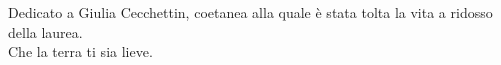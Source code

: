 \cleardoublepage
{}
\thispagestyle{empty}

\vspace*{3cm}

\begin{center}
    Dedicato a Giulia Cecchettin, coetanea alla quale è stata tolta la vita a ridosso della laurea. \\ 
    Che la terra ti sia lieve.
\end{center}
